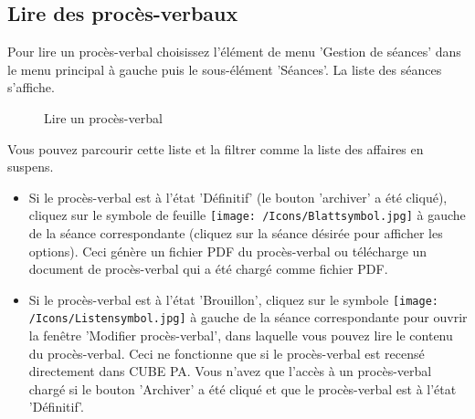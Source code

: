 \subsection{Lire des procès-verbaux}

Pour lire un procès-verbal choisissez l'élément de menu 'Gestion de séances' dans le menu principal à gauche puis le sous-élément 'Séances'. La liste des séances s'affiche.

\begin{figure}[H]
\caption{Lire un procès-verbal}
\end{figure}

Vous pouvez parcourir cette liste et la filtrer comme la liste des affaires en suspens.

\begin{itemize}
\item
Si le procès-verbal est à l'état 'Définitif' (le bouton 'archiver' a été cliqué), cliquez sur le symbole de feuille \texttt{[image: /Icons/Blattsymbol.jpg]}  à gauche de la séance correspondante (cliquez sur la séance désirée pour afficher les options). Ceci génère un fichier PDF du procès-verbal ou télécharge un document de procès-verbal qui a été chargé comme fichier PDF.
\item
Si le procès-verbal est à l'état 'Brouillon', cliquez sur le symbole \texttt{[image: /Icons/Listensymbol.jpg]}  à gauche de la séance correspondante pour ouvrir la fenêtre 'Modifier procès-verbal', dans laquelle vous pouvez lire le contenu du procès-verbal. Ceci ne fonctionne que si le procès-verbal est recensé directement dans CUBE PA. Vous n'avez que l'accès à un procès-verbal chargé si le bouton 'Archiver' a été cliqué et que le procès-verbal est à l'état 'Définitif'.
\end{itemize}
